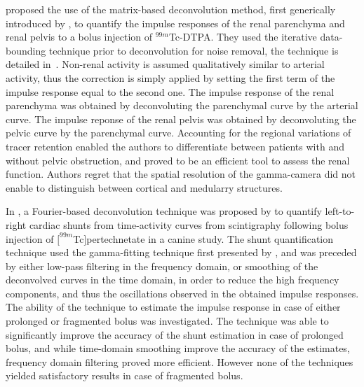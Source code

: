 \citet{Diffey:1976tk} proposed the use of the matrix-based deconvolution method, first generically introduced by \citet{Valentinuzzi:1975tr}, to quantify the impulse responses of the renal parenchyma and renal pelvis to a bolus injection of $^{99m}$Tc-DTPA. 
They used the iterative data-bounding technique prior to deconvolution for noise removal, the technique is detailed in~\cite{Diffey:1976bf}.
Non-renal activity is assumed qualitatively similar to arterial activity, thus the correction is simply applied by setting the first term of the impulse response equal to the second one.
The impulse response of the renal parenchyma was obtained by deconvoluting the parenchymal curve by the arterial curve.
The impulse reponse of the renal pelvis was obtained by deconvoluting the pelvic curve by the parenchymal curve.
Accounting for the regional variations of tracer retention enabled the authors to differentiate between patients with and without pelvic obstruction, and proved to be an efficient tool to assess the renal function.
Authors regret that the spatial resolution of the gamma-camera did not enable to distinguish between cortical and medularry structures.

In \citeyear{Alderson:1979ts}, a Fourier-based deconvolution technique was proposed by \citet{Alderson:1979ts} to quantify left-to-right cardiac shunts from time-activity curves from scintigraphy following bolus injection of $[^{99m}$Tc]pertechnetate in a canine study. 
The shunt quantification technique used the gamma-fitting technique first presented by \citet{Maltz:1973jj}, and was preceded by either low-pass filtering in the frequency domain, or smoothing of the deconvolved curves in the time domain, in order to reduce the high frequency components, and thus the oscillations observed in the obtained impulse responses.
The ability of the technique to estimate the impulse response in case of either prolonged or fragmented bolus was investigated.
The technique was able to significantly improve the accuracy of the shunt estimation in case of prolonged bolus, and while time-domain smoothing improve the accuracy of the estimates, frequency domain filtering proved more efficient.
However none of the techniques yielded satisfactory results in case of fragmented bolus.

